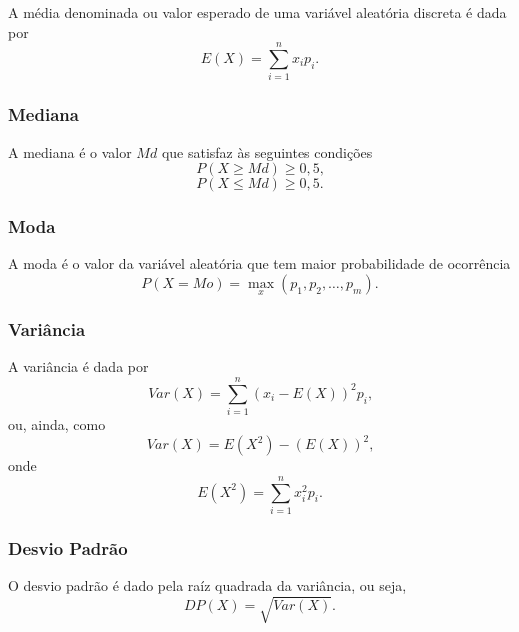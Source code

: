 \documentclass[11pt,fleqn]{book}
\numberwithin{mpicture}{chapter}
\numberwithin{mtable}{chapter}
\numberwithin{mframe}{chapter}
\begin{document}
A média denominada  ou valor esperado de uma variável aleatória discreta é dada por
\begin{equation}
	E(X)=\sum_{i=1}^{n} x_i p_i\text{.}
\end{equation}

\subsubsection*{Mediana}

A mediana é o valor $Md$ que satisfaz às seguintes condições
\begin{equation}
	P(X \geqslant Md) \geqslant 0,5\text{,}
\end{equation}
\begin{equation}
	P(X \leqslant Md) \geqslant 0,5\text{.}
\end{equation}

\subsubsection*{Moda}

A moda é o valor da variável aleatória que tem maior probabilidade de ocorrência
\begin{equation}
	P(X=Mo)=\max_{x} (p_1, p_2, \dots, p_m)\text{.}
\end{equation}

\subsubsection*{Variância}

A variância é dada por
\begin{equation}
	Var(X)=\sum_{i=1}^{n} (x_i - E(X))^2 p_i\text{,}
\end{equation}
ou, ainda, como
\begin{equation}
	Var(X)=E(X^2)-(E(X))^2\text{,}
\end{equation}
onde 
\begin{equation}
	E(X^2)=\sum_{i=1}^{n} x_i^2 p_i\text{.}
\end{equation}

\subsubsection*{Desvio Padrão}

O desvio padrão é dado pela raíz quadrada da variância, ou seja,
\begin{equation}
	DP(X)=\sqrt{Var(X)}\text{.}
\end{equation}
\end{document}

